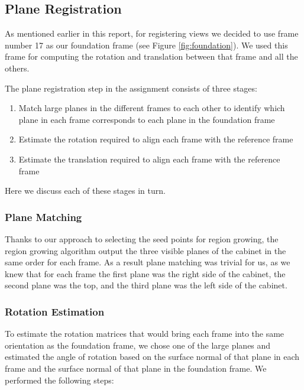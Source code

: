 \subsection{Plane Registration}

As mentioned earlier in this report, for registering views we decided to use frame number 17 as our foundation frame (see Figure \ref{fig:foundation}). We used this frame for computing the rotation and translation between that frame and all the others.

The plane registration step in the assignment consists of three stages:

\begin{enumerate}
	\item Match large planes in the different frames to each other to identify which plane in each frame corresponds to each plane in the foundation frame
	\item Estimate the rotation required to align each frame with the reference frame
	\item Estimate the translation required to align each frame with the reference frame 
\end{enumerate}

Here we discuss each of these stages in turn.

\subsubsection{Plane Matching}

Thanks to our approach to selecting the seed points for region growing, the region growing algorithm output the three visible planes of the cabinet in the same order for each frame. As a result plane matching was trivial for us, as we knew that for each frame the first plane was the right side of the cabinet, the second plane was the top, and the third plane was the left side of the cabinet.

\subsubsection{Rotation Estimation}

To estimate the rotation matrices that would bring each frame into the same orientation as the foundation frame, we chose one of the large planes and estimated the angle of rotation based on the surface normal of that plane in each frame and the surface normal of that plane in the foundation frame. We performed the following steps:

